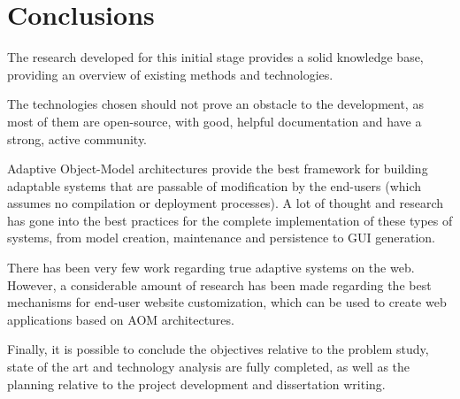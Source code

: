 \chapter{Conclusions}\label{chap:conclusions}

The research developed for this initial stage provides a solid knowledge base, providing an overview of existing methods and technologies.

The technologies chosen should not prove an obstacle to the development, as most of them are open-source, with good, helpful documentation and have a strong, active community.

Adaptive Object-Model architectures provide the best framework for building adaptable systems that are passable of modification by the end-users (which assumes no compilation or deployment processes). A lot of thought and research has gone into the best practices for the complete implementation of these types of systems, from model creation, maintenance and persistence to GUI generation.

There has been very few work regarding true adaptive systems on the web. However, a considerable amount of research has been made regarding the best mechanisms for end-user website customization, which can be used to create web applications based on AOM architectures. 

Finally, it is possible to conclude the objectives relative to the problem study, state of the art and technology analysis are fully completed, as well as the planning relative to the project development and dissertation writing.

